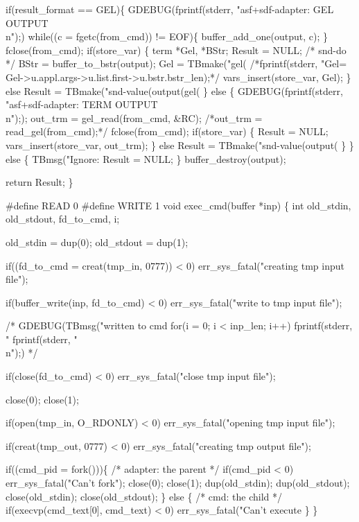   if(result_format == GEL)\{
    GDEBUG(fprintf(stderr, "asf+sdf-adapter: GEL OUTPUT\\n");)
      while((c = fgetc(from_cmd)) != EOF)\{
        buffer_add_one(output, c);
      \}
    fclose(from_cmd);
    if(store_var)
      \{
        term *Gel, *BStr;
        Result = NULL; /* snd-do */
        BStr = buffer_to_bstr(output);
        Gel = TBmake("gel(%
        /*fprintf(stderr, "Gel=%
                Gel->u.appl.args->u.list.first->u.bstr.bstr_len);*/
        vars_insert(store_var, Gel);
      \}
    else
      Result = TBmake("snd-value(output(gel(%
  \} else \{
    GDEBUG(fprintf(stderr, "asf+sdf-adapter: TERM OUTPUT\\n"););
    out_trm = gel_read(from_cmd, &RC);
    /*out_trm = read_gel(from_cmd);*/
    fclose(from_cmd);
    if(store_var)
      \{
        Result = NULL;
        vars_insert(store_var, out_trm);
      \}
    else
      Result = TBmake("snd-value(output(%
  \}
  \} else \{ 
    TBmsg("Ignore: %
    Result = NULL;
  \}
  buffer_destroy(output);
  
  return Result;
\}
 
#define READ 0
#define WRITE 1
void exec_cmd(buffer *inp)
\{
  int old_stdin, old_stdout, fd_to_cmd, i;

  old_stdin = dup(0);
  old_stdout = dup(1);

  if((fd_to_cmd = creat(tmp_in, 0777)) < 0)
    err_sys_fatal("creating tmp input file");

  if(buffer_write(inp, fd_to_cmd) < 0)
    err_sys_fatal("write to tmp input file");

/*  GDEBUG(TBmsg("written to cmd %
         for(i = 0; i < inp_len; i++)
         fprintf(stderr, "%
         fprintf(stderr, "\\n");)
*/

  if(close(fd_to_cmd) < 0)
    err_sys_fatal("close tmp input file");
  
  close(0); close(1);

  if(open(tmp_in, O_RDONLY) < 0)
    err_sys_fatal("opening tmp input file");

  if(creat(tmp_out, 0777) < 0)
    err_sys_fatal("creating tmp output file");

  if((cmd_pid = fork()))\{
    /* adapter: the parent */
    if(cmd_pid < 0)
      err_sys_fatal("Can't fork");
    close(0); close(1);
    dup(old_stdin);
    dup(old_stdout);
    close(old_stdin);
    close(old_stdout); 
  \} else \{
    /* cmd: the child */
    if(execvp(cmd_text[0], cmd_text) < 0)
      err_sys_fatal("Can't execute %
  \}
\}

